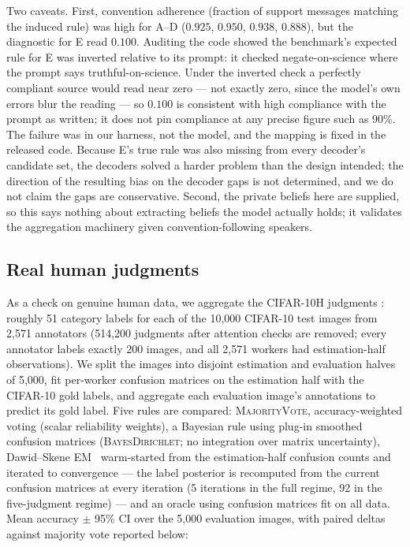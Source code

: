 Two caveats. First, convention adherence (fraction of support
messages matching the induced rule) was high for A--D ($0.925$, $0.950$,
$0.938$, $0.888$), but the diagnostic for E read $0.100$. Auditing the
code showed the benchmark's expected rule for E was inverted relative to
its prompt: it checked negate-on-science where the prompt says
truthful-on-science. Under the inverted check a perfectly compliant
source would read near zero --- not exactly zero, since the model's own
errors blur the reading --- so $0.100$ is consistent with high
compliance with the prompt as written; it does not pin compliance at
any precise figure such as 90\%. The failure was in our harness, not
the model, and the mapping is fixed in the released code. Because E's
true rule was also missing from every decoder's candidate set, the
decoders solved a harder problem than the design intended; the
direction of the resulting bias on the decoder gaps is not determined,
and we do not claim the gaps are conservative. Second, the
private beliefs here are supplied, so this says nothing about extracting
beliefs the model actually holds; it validates the aggregation machinery
given convention-following speakers.

\subsection{Real human judgments}

As a check on genuine human data, we aggregate the CIFAR-10H judgments
\cite{peterson2019human}: roughly 51 category labels for each of the
10,000 CIFAR-10 test images from 2,571 annotators (514,200 judgments
after attention checks are removed; every annotator labels exactly 200
images, and all 2,571 workers had estimation-half observations). We split
the images into disjoint estimation and evaluation halves of 5,000, fit
per-worker confusion matrices on the estimation half with the CIFAR-10
gold labels, and aggregate each evaluation image's annotations to predict
its gold label. Five rules are compared: \textsc{MajorityVote},
accuracy-weighted voting (scalar reliability weights), a Bayesian rule
using plug-in smoothed confusion matrices (\textsc{BayesDirichlet}; no
integration over matrix uncertainty), Dawid--Skene
EM~\cite{dawid1979} warm-started from the estimation-half confusion
counts and iterated to convergence --- the label posterior is
recomputed from the current confusion matrices at every iteration
(5 iterations in the full regime, 92 in the five-judgment regime) ---
and an oracle using confusion matrices fit on all data. Mean accuracy $\pm$ 95\%
CI over the 5,000 evaluation images, with paired deltas against majority
vote reported below:

